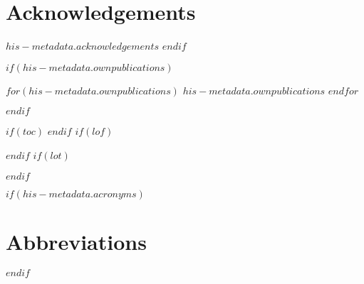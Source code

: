 \chapter*{Acknowledgements}
$his-metadata.acknowledgements$
$endif$
    
$if(his-metadata.ownpublications)$
\begin{ownpublications}
	$for(his-metadata.ownpublications)$
	$his-metadata.ownpublications$
	$endfor$

\end{ownpublications}
$endif$

$if(toc)$
\tableofcontents
$endif$
$if(lof)$
\listoffigures
$endif$
$if(lot)$
\listoftables
$endif$

$if(his-metadata.acronyms)$
\isdissertation{\cleardoublepage}{\clearpage}
\chapter*{Abbreviations}
\renewcommand{\glossarysection}[2][]{} %
\printglossary
$endif$

\isdissertation{\cleardoublepage}{\clearpage}
\setcounter{page}{1}%
\pagestyle{headings}


